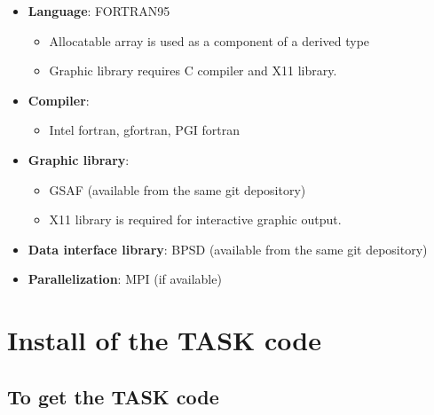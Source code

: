 \documentclass[11pt]{article}
\begin{document}
\begin{itemize}
\item
\textbf{Language}: FORTRAN95 
\begin{itemize}
\item
Allocatable array is used as a component of a derived type
\item
Graphic library requires C compiler and X11 library.
\end{itemize}
\item
\textbf{Compiler}: 
\begin{itemize}
\item
Intel fortran, gfortran, PGI fortran
\end{itemize}
\item
\textbf{Graphic library}: 
\begin{itemize}
\item
GSAF (available from the same git depository)
\item
X11 library is required for interactive graphic output.
\end{itemize}
\item
\textbf{Data interface library}: BPSD (available from the same git depository)
\item
\textbf{Parallelization}: MPI (if available)
\end{itemize}

\section{Install of the TASK code}

\subsection{To get the TASK code}
\end{document}
